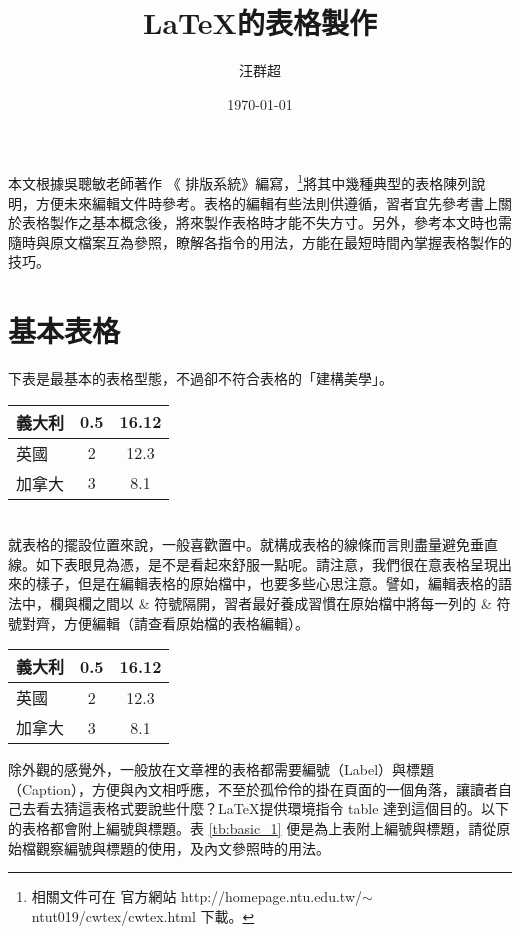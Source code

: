 \documentclass[12pt, a4paper]{article}
\title{ \LaTeX  {\MB 的表格製作}}
\author{{\SM 汪群超}}
\date{{\TT \today}}
\begin{document}
\maketitle
\fontsize{12}{22pt}\selectfont

本文根據吳聰敏老師著作 《\cw{} 排版系統》編寫，\footnote{相關文件可在 \cw{} 官方網站  http://homepage.ntu.edu.tw/$\sim$ntut019/cwtex/cwtex.html 下載。}將其中幾種典型的表格陳列說明，方便未來編輯文件時參考。表格的編輯有些法則供遵循，習者宜先參考書上關於表格製作之基本概念後，將來製作表格時才能不失方寸。另外，參考本文時也需隨時與原文檔案互為參照，瞭解各指令的用法，方能在最短時間內掌握表格製作的技巧。


\section{基本表格}
下表是最基本的表格型態，不過卻不符合表格的「建構美學」。\\

\begin{tabular}{|l|c|c|}%
\hline  %
  義大利	& 0.5	& 16.12		\\\hline  %
  英國	& 2     	& 12.3		\\\hline
  加拿大	& 3     	& 8.1		\\\hline
\end{tabular}\\

就表格的擺設位置來說，一般喜歡置中。就構成表格的線條而言則盡量避免垂直線。如下表眼見為憑，是不是看起來舒服一點呢。請注意，我們很在意表格呈現出來的樣子，但是在編輯表格的原始檔中，也要多些心思注意。譬如，編輯表格的語法中，欄與欄之間以 \& 符號隔開，習者最好養成習慣在原始檔中將每一列的 \& 符號對齊，方便編輯（請查看原始檔的表格編輯）。\\

\begin{center} %
\begin{tabular}{lcc}  %
\hline
  義大利	& 0.5	& 16.12		\\\hline  %
  英國   & 2     	& 12.3		\\\hline
  加拿大 	& 3     	& 8.1		\\\hline
\end{tabular}
\end{center}
\bigskip
除外觀的感覺外，一般放在文章裡的表格都需要編號（Label）與標題（Caption），方便與內文相呼應，不至於孤伶伶的掛在頁面的一個角落，讓讀者自己去看去猜這表格式要說些什麼？\LaTeX 提供環境指令 {\A table} 達到這個目的。以下的表格都會附上編號與標題。表 \ref{tb:basic_1} 便是為上表附上編號與標題，請從原始檔觀察編號與標題的使用，及內文參照時的用法。
\end{document}
